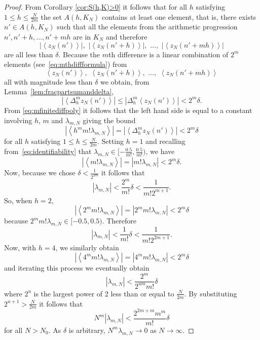 \documentclass[aap]{imsart}
\newcommand{\fracpart}[1]{\left\langle #1 \right\rangle}
\newcommand{\sabs}[1]{\vert #1 \vert}
\begin{document}
\begin{proof}
From Corollary \ref{cor:S(h,K)>0} it follows that for all $h$ satisfying $1\leq h \leq\frac{N}{2m}$ the set $A(h,K_N)$ contains at least one element, that is, there exists $n' \in A(h,K_N)$ such that all the elements from the arithmetic progression $n', n'+h, \dots, n' + mh$ are in $K_N$ and therefore 
\[
\sabs{\fracpart{z_N(n')}},\,\, \sabs{\fracpart{z_N(n'+h)}}, \,\, \dots, \,\, \sabs{\fracpart{z_N(n'+mh)}} 
\] 
are all less than $\delta$.  Because the $m$th difference is a linear combination of $2^{m}$ elements (see~\eqref{eq:mthdiffformula}) from 
\[
\fracpart{z_N(n')}, \,\, \fracpart{z_N(n'+h)}, \,\, \dots, \,\, \fracpart{z_N(n'+mh)}
\]
all with magnitude less than $\delta$ we obtain, from Lemma~\ref{lem:fracpartsumanddelta},
\begin{equation}\label{eq:Deltazfracbound}
|\fracpart{\Delta_h^m z_N(n')}| \leq |\Delta_h^m \fracpart{ z_N(n')}| < 2^{m}\delta.
\end{equation}
From \eqref{eq:mfinitediffpoly} it follows that the left hand side is equal to a constant involving $h$, $m$ and $\lambda_{m,N}$ giving the bound
\begin{equation}\label{eq:startiterativearg}
|\fracpart{ h^m m! \lambda_{m,N} }|  = |\fracpart{   \Delta_h^m z_N(n') }| < 2^m\delta
\end{equation}
for all $h$ satisfying $1\leq h \leq\frac{N}{2m}$. Setting $h = 1$ and recalling from~\eqref{eq:identifiability} that $\lambda_{m,N} \in [-\tfrac{0.5}{m!}, \tfrac{0.5}{m!})$, we have
 \[
 |\fracpart{ m! \lambda_{m,N} }| = | m! \lambda_{m,N} |< 2^m\delta.
 \]
Now, because we chose $\delta < \tfrac{1}{2^{2m}}$ it follows that 
\[
| \lambda_{m,N} |< \frac{2^m}{m!}\delta < \frac{1}{m! 2^{m+1}}.
\]
So, when $h = 2$, 
\[
|\fracpart{ 2^m m! \lambda_{m,N} }| = | 2^m m! \lambda_{m,N} |< 2^m\delta
\]
because $2^m m! \lambda_{m,N} \in [-0.5, 0.5)$. Therefore
\[
| \lambda_{m,N} |< \frac{1}{m!}\delta < \frac{1}{m! 2^{2m+1}}.
\]
Now, with $h = 4$, we similarly obtain 
\[
|\fracpart{ 4^m m! \lambda_{m,N} }| = | 4^m m! \lambda_{m,N} |< 2^m\delta
\]
and iterating this process we eventually obtain 
\[
| \lambda_{m,N} | < \frac{2^m}{2^{um} m!}\delta
\]
where $2^u$ is the largest power of 2 less than or equal to $\tfrac{N}{2m}$.  %
By substituting $2^{u+1} > \frac{N}{2m}$ it follows that
 \begin{equation}\label{eq:enditerativearg}
 N^m|\lambda_{m,N}| < \frac{2^{2m+m}m^m}{m!}\delta
 \end{equation}
for all $N > N_0$.  As $\delta$ is arbitrary, $N^m \lambda_{m,N} \rightarrow 0$ as $N\rightarrow \infty$.


\end{proof}
\end{document}
